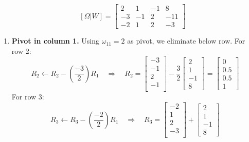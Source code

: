 \documentclass[../../../main.tex]{subfiles}
\begin{document}
\begin{equation*}
    \quad
    [\Omega|W] =
    \begin{bmatrix}
        2  & 1  & -1 & 8   \\
        -3 & -1 & 2  & -11 \\
        -2 & 1  & 2  & -3
    \end{bmatrix}
\end{equation*}
\begin{enumerate}
    \item \textbf{Pivot in column 1.}
          Using $\omega_{11} = 2$ as pivot, we eliminate below row.
          For row 2:
          \begin{equation*}
              R_2 \leftarrow R_2 - \left(\frac{-3}{2}\right)R_1 \quad \Rightarrow \quad
              R_2=
              \begin{bmatrix}
                  -3 \\-1\\2\\-1\\
              \end{bmatrix}
              - \frac{3 }{2}
              \begin{bmatrix}
                  2 \\1\\-1\\8
              \end{bmatrix}
              =
              \begin{bmatrix}
                  0 \\ 0.5 \\ 0.5 \\ 1
              \end{bmatrix}
          \end{equation*}
          For row 3:
          \begin{equation*}
              R_3 \leftarrow R_3 - \left(\frac{-2}{2}\right)R_1 \quad \Rightarrow \quad
              R_3=
              \begin{bmatrix}
                  -2 \\1\\2\\-3\\
              \end{bmatrix}
              +
              \begin{bmatrix}
                  2 \\1\\-1\\8

\end{bmatrix}
\end{equation*}
\end{enumerate}
\end{document}
